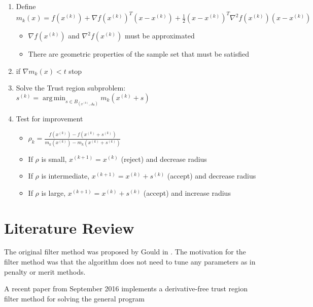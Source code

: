 \documentclass{article}
\DeclareMathOperator*{\argmin}{arg\,min}
\begin{document}
\begin{enumerate}
	\item Define $m_k(x) = f(x^{(k)}) + \nabla f(x^{(k)})^T (x-x^{(k)}) + \frac 1 2 (x-x^{(k)})^T\nabla^2f(x^{(k)})(x-x^{(k)})$
	\begin{itemize}
		\item $\nabla f(x^{(k)})$ and $\nabla^2 f(x^{(k)})$ must be approximated
		\item There are geometric properties of the sample set that must be satisfied
	\end{itemize}
	\item if $\nabla m_k(x) < t$ stop
	\item Solve the Trust region subproblem: $s^{(k)} = \argmin_{s\in B_(x^{(k)}, \Delta_k)} m_k(x^{(k)} + s)$
	\item Test for improvement
	\begin{itemize}
		\item $\rho_k = \frac{f(x^{(k)}) - f(x^{(k)}+s^{(k)})}{m_k(x^{(k)}) - m_k(x^{(k)}+s^{(k)})}$
		\item If $\rho$ is small, $x^{(k+1)}=x^{(k)}$ (reject) and decrease radius
		\item If $\rho$ is intermediate, $x^{(k+1)}=x^{(k)}+s^{(k)}$ (accept) and decrease radius
		\item If $\rho$ is large, $x^{(k+1)}=x^{(k)}+s^{(k)}$ (accept) and increase radius
	\end{itemize}
\end{enumerate}




\section{Literature Review}

The original filter method was proposed by Gould in \cite{DUMMY:original_filter}. The motivation for the filter method was that the algorithm does not need to tune any parameters as in penalty or merit methods.

A recent paper from September 2016 \cite{DUMMY:Biegler} implements a derivative-free trust region filter method for solving the general program
\end{document}
